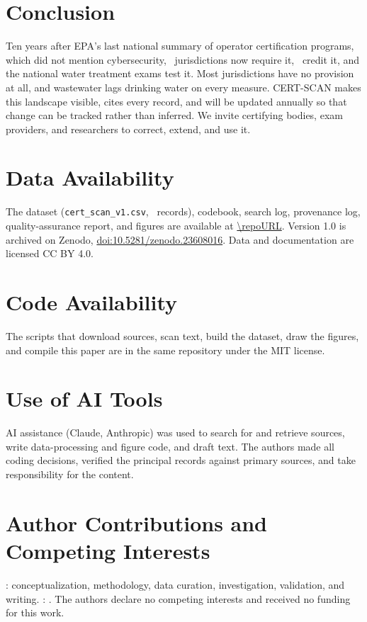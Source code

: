 \documentclass[10pt,twocolumn,letterpaper]{article}
\begin{document}
\section{Conclusion}\label{sec:conclusion}

Ten years after EPA's last national summary of operator certification programs, which did not mention cybersecurity, \nReqJurisW\ jurisdictions now require it, \nCredJurisW\ credit it, and the national water treatment exams test it. Most jurisdictions have no provision at all, and wastewater lags drinking water on every measure. CERT-SCAN makes this landscape visible, cites every record, and will be updated annually so that change can be tracked rather than inferred. We invite certifying bodies, exam providers, and researchers to correct, extend, and use it.

\section*{Data Availability}
The dataset (\texttt{cert\_scan\_v1.csv}, \nRows\ records), codebook, search log, provenance log, quality-assurance report, and figures are available at \url{\repoURL}. Version 1.0 is archived on Zenodo, \href{https://doi.org/10.5281/zenodo.23608016}{doi:10.5281/zenodo.23608016}. Data and documentation are licensed CC BY 4.0.

\section*{Code Availability}
The scripts that download sources, scan text, build the dataset, draw the figures, and compile this paper are in the same repository under the MIT license.

\section*{Use of AI Tools}
AI assistance (Claude, Anthropic) was used to search for and retrieve sources, write data-processing and figure code, and draft text. The authors made all coding decisions, verified the principal records against primary sources, and take responsibility for the content.

\section*{Author Contributions and Competing Interests}
\authorName: conceptualization, methodology, data curation, investigation, validation, and writing. \coName: \coRoles. The authors declare no competing interests and received no funding for this work.
\end{document}
